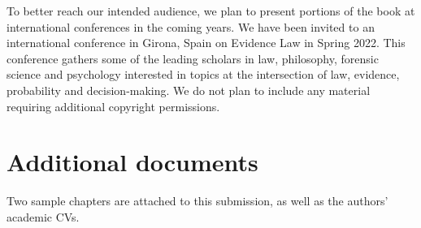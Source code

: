 \documentclass[
  10pt,
  dvipsnames,enabledeprecatedfontcommands]{scrartcl}
\begin{document}
To better reach our intended audience, we plan to present portions of
the book at international conferences in the coming years. We have been
invited to an international conference in Girona, Spain on Evidence Law
in Spring 2022. This conference gathers some of the leading scholars in
law, philosophy, forensic science and psychology interested in topics at
the intersection of law, evidence, probability and decision-making. We
do not plan to include any material requiring additional copyright
permissions.

\hypertarget{additional-documents}{%
\section{Additional documents}\label{additional-documents}}

Two sample chapters are attached to this submission, as well as the
authors' academic CVs.
\end{document}
